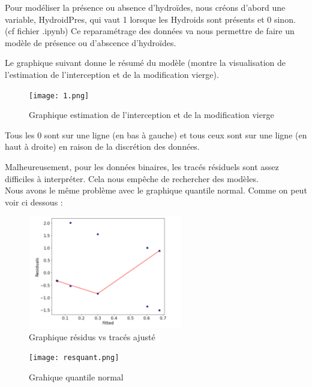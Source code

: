 \documentclass{article}
\theoremstyle{definition}
\begin{document}
Pour modéliser la présence ou absence d'hydroïdes, nous créons d'abord une variable, HydroidPres, qui vaut 1 lorsque les Hydroids sont présents et 0 sinon. (cf fichier .ipynb)
Ce reparamétrage des données va nous permettre de faire un modèle de présence ou d'abscence d'hydroïdes.

\vspace{2cm}

Le graphique suivant donne le résumé du modèle (montre la visualisation de l'estimation de l'interception et de la modification vierge).

\begin{figure}[!h]
\texttt{[image: 1.png]}
\caption{Graphique estimation de l'interception et de la modification vierge}
\label{exemple somme}
\end{figure}

\vspace{2cm}

Tous les 0 sont sur une ligne (en bas à gauche) et tous ceux sont sur une ligne (en haut à droite) en raison de la discrétion des données.\\

\newpage

Malheureusement, pour les données binaires, les tracés résiduels sont assez difficiles à interpréter. 
Cela nous empêche de rechercher des modèles. \\
Nous avons le même problème avec le graphique quantile normal.
Comme on peut voir ci dessous :


\begin{center}
\begin{figure}[!h]
\centerline{\includegraphics[width=0.6\textwidth]{bonresfit.png}}
\caption{Graphique résidus vs tracés ajusté}
\label{exemple somme}
\end{figure}


\begin{figure}[!h]
\centerline{\texttt{[image: resquant.png]}}
\caption{Grahique quantile normal}
\label{exemple somme}
\end{figure}
\end{center}
\end{document}

